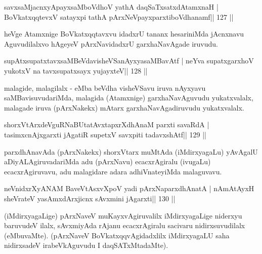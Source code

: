 \begin{shl}
savxsaMjacnxyA\s payxsaMboVdhoV yathA daqSaTxsatxdAtamxnaH |
BoVkatxqqtevxV satayxpi tathA pArxNeV\s payxparxtiboVdhanamf\hfill || 127 ||
\end{shl}

\begin{artha}
heVge Atamxnige BoVkatxqqtavxvu idadxrU tananx hesariniMda jAcnxnavu 
Aguvudilalxvo hAgeyeV pArxNavidadxrU garxhaNavAgade iruvudu.
\end{artha} 

\begin{shl}
supAtxsupatxtavxsaMBeVdavisheVSanAyxyasaMBavAtf |
neYva supatxgarxhoV yukotxV na tavxsupatxsayx yujayxteV\hfill || 128 ||
\end{shl}

\begin{artha}
malagide, malagilalx - eMba beVdha visheVSavu iruva nAyxyavu saMBavisuvudariMda, malagida (Atamxnige) garxhaNavAguvudu yukatxvalalx, malagade iruva (pArxNakekx) mAtarx garxhaNavAgadiruvudu yukatxvalalx.
\end{artha}


\begin{shl}
shorxVtArxdeVguRNaBUtatAvxtapxrXdhAnaM parxti savaRdA |
tasimxcnAjxgarxti jAgatiR supetxV savxpiti tadavxshAtf\hfill || 129 ||
\end{shl}

\begin{artha}
parxdhAnavAda (pArxNakekx) shorxVtarx muMtAda (iMdirxyagaLu) yAvAgalU aDiyALAgiruvadariMda adu (pArxNavu) ecacxrAgiralu (ivugaLu) ecacxrAgiruvavu, adu malagidare adara adhiVnateyiMda malaguvavu.
\end{artha}

\begin{shl}
neVnidxrXyANAM BaveVtAsxvXpoV yadi pArxNaparxdhAnatA |
nAmAtAyxH sheVrateV yasAmxdArxjicnx sAvxmini jAgarxti\hfill || 130 ||
\end{shl}

\begin{artha}
(iMdirxyagaLige) pArxNaveV muKayxvAgiruvalilx iMdirxyagaLige niderxyu  baruvudeV ilalx, sAvxmiyAda rAjanu ecacxrAgiralu sacivaru nidirxsuvudilalx (eMbuvaMte). (pArxNaveV BoVkatxqqvAgidadxlilx iMdirxyagaLU saha nidirxsadeV irabeVkAguvudu I daqSATxMtadaMte).
\end{artha}


